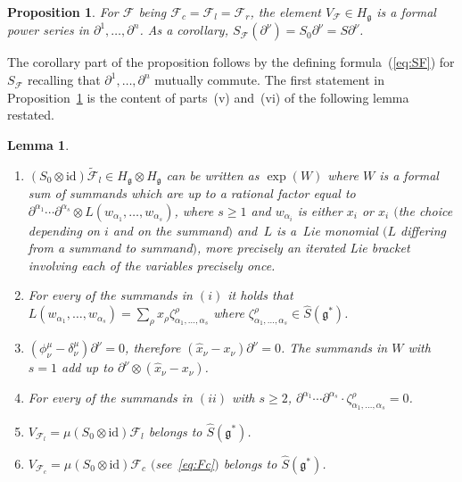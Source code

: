 \documentclass[10pt,a4paper]{amsart}
\def\gg{\mathfrak{g}}
\def\id{\mathrm{id}}
\newtheorem{Lemma}[Theorem]{Lemma}
\newtheorem{Proposition}[Theorem]{Proposition}
 { \theoremstyle{definition}
\newtheorem{Definition}[Theorem]{Definition}
\newtheorem{Example}[Theorem]{Example}
\newtheorem{Remark}[Theorem]{Remark} }
\numberwithin{equation}{section}
\begin{document}
\begin{Proposition}\label{prop:Fpartial}
For $\mathcal{F}$ being $\mathcal{F}_c = \mathcal{F}_l = \mathcal{F}_r$, the element $V_{\mathcal{F}}\in H_\gg$ is a formal power series in $\partial^1,\dots,\partial^n$. As a corollary, $S_{\mathcal{F}}(\partial^\nu) = S_0 \partial^\nu = S \partial^\nu$.
\end{Proposition}
The corollary part of the proposition follows by the defining formula~(\ref{eq:SF}) for $S_{\mathcal{F}}$ recalling that $\partial^1,\dots,\partial^n$ mutually commute. The first statement in Proposition~\ref{prop:Fpartial} is the content of parts~(v) and~(vi) of the following lemma restated.
\begin{Lemma}\quad
\begin{enumerate}\itemsep=0pt
\item[$(i)$] $(S_0\otimes\id)\tilde{\mathcal{F}}_l\in H_\gg\otimes H_\gg$ can be written as $\exp(W)$ where $W$ is a formal sum of summands which are up to a rational factor equal to $\partial^{\alpha_1}\cdots\partial^{\alpha_s}\otimes L(w_{\alpha_1},\dots,w_{\alpha_s})$, where $s\geq 1$ and $w_{\alpha_i}$ is either $x_i$ or $\hat{x}_i$ $($the choice depending on $i$ and on the summand$)$ and~$L$ is a~Lie monomial $(L$ differing from a summand to summand$)$, more precisely an iterated Lie bracket involving each of the variables precisely once.

\item[$(ii)$] For every of the summands in $(i)$ it holds that $L(w_{\alpha_1},\dots,w_{\alpha_s}) = \sum_\rho x_\rho\zeta^{\rho}_{\alpha_1,\dots,\alpha_s}$ where $\zeta^{\rho}_{\alpha_1,\dots,\alpha_s}\in\hat{S}(\gg^*)$.

\item[$(iii)$] $(\phi^\mu_\nu-\delta^\mu_\nu)\partial^\nu=0$, therefore $(\hat{x}_\nu-x_\nu)\partial^\nu = 0$. The summands in $W$ with $s = 1$ add up to $\partial^\nu\otimes(\hat{x}_\nu-x_\nu)$.

\item[$(iv)$] For every of the summands in $(ii)$ with $s\geq 2$, $\partial^{\alpha_1}\cdots\partial^{\alpha_s}\cdot\zeta^{\rho}_{\alpha_1,\dots,\alpha_s} = 0$.

\item[$(v)$] $V_{\mathcal{F}_l} = \mu(S_0\otimes\id)\mathcal{F}_l$ belongs to $\hat{S}(\gg^*)$.

\item[$(vi)$] $V_{\mathcal{F}_c} = \mu(S_0\otimes\id)\mathcal{F}_c$ $($see~\eqref{eq:Fc}$)$ belongs to $\hat{S}(\gg^*)$.
\end{enumerate}
\end{Lemma}
\end{document}
